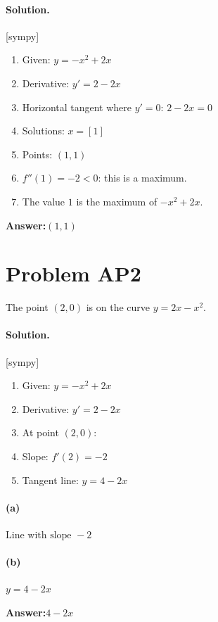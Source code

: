 \documentclass[11pt,a4paper]{article}
\newcommand{\solvertag}[1]{{\footnotesize\color{gray}\textsf{[#1]}}}
\begin{document}
\paragraph{Solution.} \solvertag{sympy} 

\begin{enumerate}[leftmargin=*]
  \item Given: $y = - x^{2} + 2 x$
  \item Derivative: $y' = 2 - 2 x$
  \item Horizontal tangent where $y' = 0$: $2 - 2 x = 0$
  \item Solutions: $x = \left[ 1\right]$
  \item Points: $(1, 1)$
  \item $f''(1) = -2 < 0$: this is a maximum.
  \item The value $1$ is the maximum of $- x^{2} + 2 x$.
\end{enumerate}

\noindent\textbf{Answer:}\quad $(1, 1)$

\medskip

\section*{Problem AP2}
The point $(2, 0)$ is on the curve $y = 2x - x^2$.

\paragraph{Solution.} \solvertag{sympy} 

\begin{enumerate}[leftmargin=*]
  \item Given: $y = - x^{2} + 2 x$
  \item Derivative: $y' = 2 - 2 x$
  \item At point $(2, 0)$:
  \item Slope: $f'(2) = -2$
  \item Tangent line: $y = 4 - 2 x$
\end{enumerate}

\paragraph{(a)} $\text{Line with slope } -2$

\paragraph{(b)} $y = 4 - 2 x$

\noindent\textbf{Answer:}\quad $4 - 2 x$

\medskip
\end{document}

